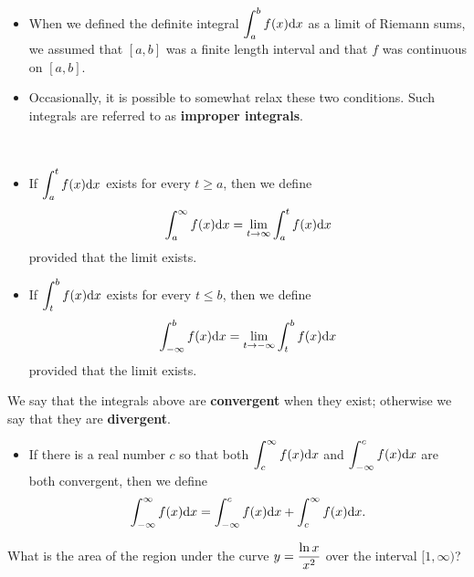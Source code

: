 

\begin{remark}\,
\begin{itemize}
\item When we defined the definite integral $\displaystyle\int_a^bf(x)\mathrm{d} x$ as a limit of Riemann sums, we assumed that $[a,b]$ was a finite length interval and that $f$ was continuous on $[a,b]$.
\item Occasionally, it is possible to somewhat relax these two conditions.
Such integrals are referred to as \textbf{improper integrals}.
\end{itemize}
\end{remark}

\begin{definition}\,
\begin{itemize}
\item If $\displaystyle\int_a^tf(x)\mathrm{d} x$ exists for every $t\ge a$, then we define
\begin{equation*}
\int_a^\infty f(x)\mathrm{d} x = \lim_{t\to\infty}\int_a^t f(x)\mathrm{d} x
\end{equation*}
provided that the limit exists.
\item If $\displaystyle\int_t^bf(x)\mathrm{d} x$ exists for every $t\le b$, then we define
\begin{equation*}
\int_{-\infty}^b f(x)\mathrm{d} x = \lim_{t\to-\infty}\int_t^b f(x)\mathrm{d} x
\end{equation*}
provided that the limit exists.
\end{itemize}
We say that the integrals above are \textbf{convergent} when they exist; otherwise we say that they are \textbf{divergent}.
\begin{itemize}
\item If there is a real number $c$ so that both $\displaystyle\int_c^\infty f(x)\mathrm{d} x$ and $\displaystyle\int_{-\infty}^cf(x)\mathrm{d} x$ are both convergent, then we define
\begin{equation*}
\int_{-\infty}^\infty f(x)\mathrm{d} x = \int_{-\infty}^cf(x)\mathrm{d} x + \int_c^\infty f(x)\mathrm{d} x.
\end{equation*}
\end{itemize}
\end{definition}

\newpage

\begin{example}
What is the area of the region under the curve $y=\displaystyle\frac{\ln x}{x^2}$ over the interval $[1,\infty)$?
\end{example}

